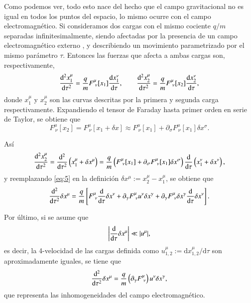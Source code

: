 Como podemos ver, todo esto nace del hecho que el campo gravitacional no es igual en todos los puntos del espacio, lo mismo ocurre con el campo electromagnético. Si consideramos dos cargas con el mismo cociente $q/m$ separadas infinitesimalmente, siendo afectadas por la presencia de un campo electromagnético externo , y describiendo un movimiento parametrizado por el mismo parámetro $\tau$. Entonces las fuerzas que afecta a ambas cargas son, respectivamente,
\begin{equation}
\label{eq:4}
\dv[2]{x_1^{\mu}}{\tau} = \frac{q}{m} F^{\mu}_{\ \nu}[x_1] \dv{x_1^{\nu}}{\tau}, \qquad 
\dv[2]{x_2^{\mu}}{\tau} = \frac{q}{m} F^{\mu}_{\ \nu}[x_2] \dv{x_2^{\nu}}{\tau},
\end{equation}
donde $x_1^{\mu}$ y $x_2^{\mu}$ son las curvas descritas por la primera y segunda carga respectivamente. Expandiendo el tensor de Faraday hasta primer orden en serie de Taylor, se obtiene que
\begin{equation}
F^{\mu}_{\ \nu}[x_2] = F^{\mu}_{\ \nu}[x_1 + \delta x] \approx F^{\mu}_{\ \nu}[x_1] + \partial_{\sigma} F^{\mu}_{\ \nu}[x_1] \delta x^{\sigma}.
\end{equation}

Así 
\begin{equation}
\label{eq:5}
\dv[2]{x_2^{\mu}}{\tau} = \dv[2]{ }{\tau} \left( x_1^{\mu} + \delta x^{\mu} \right) = \frac{q}{m} \left( F^{\mu}_{\ \nu}[x_1] + \partial_{\sigma} F^{\mu}_{\ \nu}[x_1] \delta x^{\sigma} \right) \dv{ }{\tau} \left( x_1^{\nu} + \delta x^{\nu} \right),
\end{equation}
y reemplazando \eqref{eq:5} en la definición $\delta x^{\mu} := x_2^{\mu} - x_1^{\mu}$, se obtiene que
\begin{equation}
\dv[2]{ }{\tau} \delta x^{\mu} = \frac{q}{m} \left[ F^{\mu}_{\ \nu} \dv{ }{\tau} \delta x^{\nu} + \partial_{\gamma} F^{\mu}_{\ \nu} u^{\nu} \delta x^{\gamma} + \partial_{\gamma} F^{\mu}_{\ \nu} \delta x^{\gamma} \dv{ }{\tau} \delta x^{\nu} \right].
\end{equation}

Por último, si se asume que
\begin{equation}
\left| \dv{\tau} \delta x^{\mu} \right| \ll |u^{\mu}|,
\end{equation}
es decir, la 4-velocidad de las cargas definida como $u^{\mu}_{1,2} := \mathrm{d}x^{\mu}_{1,2}/\mathrm{d}\tau $ son aproximadamente iguales, se tiene que
\begin{equation}
\label{eq:6}
\dv[2]{ }{\tau} \delta x^{\mu} = \frac{q}{m} \left( \partial_{\gamma} F^{\mu}_{\ \nu} \right) u^{\nu} \delta x^{\gamma},
\end{equation}
que representa las inhomogeneidades del campo electromagnético.

